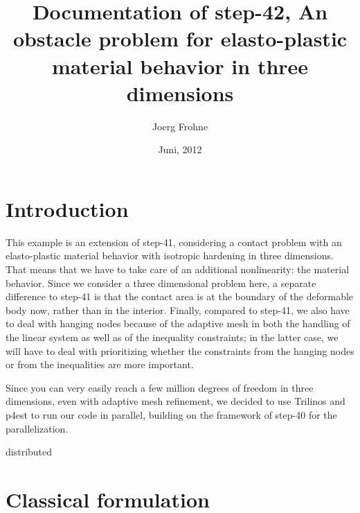 \documentclass{article}
\title{Documentation of step-42, An obstacle problem for elasto-plastic material behavior in three dimensions}
\author{Joerg Frohne}
\date{Juni, 2012}
\begin{document}
\section{Introduction}

This example is an extension of step-41, considering a contact problem with an
elasto-plastic material behavior with isotropic hardening in three dimensions.
That means that we have to take care of an additional nonlinearity: the
material behavior. Since we consider a three dimensional problem here, a
separate difference to step-41 is that the contact area is at the boundary of
the deformable body now, rather than in the interior. Finally, compared to
step-41, we also have to deal with
hanging nodes because of the adaptive mesh in both the handling of the linear
system as well as of the inequality constraints; in the latter case, we will
have to deal with prioritizing whether the constraints from the hanging nodes
or from the inequalities are more important.

Since you can very easily reach a few million degrees of freedom in three
dimensions, even with adaptive mesh refinement, we decided to use Trilinos and
p4est to run our code in parallel, building on the framework of step-40 for
the parallelization.

\begin{huge}
{distributed}
\end{huge}


\section{Classical formulation}
\end{document}
